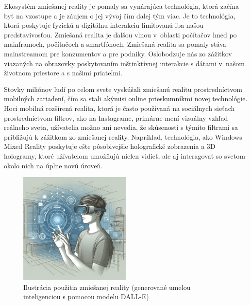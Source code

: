 Ekosystém zmiešanej reality je pomaly sa vynárajúca technológia, ktorá začína byť na vzostupe a je záujem o jej vývoj čím ďalej tým viac. Je to technológia, ktorá poskytuje fyzickú a digitálnu interakciu limitovanú iba našou predstavivosťou. Zmiešaná realita je ďalšou vlnou v~oblasti počítačov hneď po mainframoch, počítačoch a smartfónoch. Zmiešaná realita sa pomaly stáva mainstreamom pre konzumentov a pre podniky. Oslobodzuje nás zo zážitkov viazaných na obrazovky poskytovaním inštinktívnej interakcie s dátami v~našom životnom priestore a s našimi priateľmi. 

Stovky miliónov ľudí po celom svete vyskúšali zmiešanú realitu prostredníctvom mobilných zariadení, čím sa stali akýmisi online prieskumníkmi novej technológie. Hoci mobilná rozšírená realita, ktorá je často používaná na sociálnych sieťach prostredníctvom filtrov, ako na Instagrame, primárne mení vizuálny vzhľad reálneho sveta, užívatelia možno ani nevedia, že skúsenosti s týmito filtrami sa približujú k zážitkom zo zmiešanej reality. Napríklad, technológia, ako Windows Mixed Reality poskytuje ešte pôsobivejšie holografické zobrazenia a 3D hologramy, ktoré užívateľom umožňujú nielen vidieť, ale aj interagovať so svetom okolo nich na úplne novú úroveň.



\begin{figure}[h]
  \centering
  \includegraphics[width=0.5\textwidth]{img/zmiesana_realita.png}
  \caption{Ilustrácia použitia zmiešanej reality (generované umelou inteligenciou s pomocou modelu DALL-E)}
  \label{fig:mix_real}
\end{figure}

